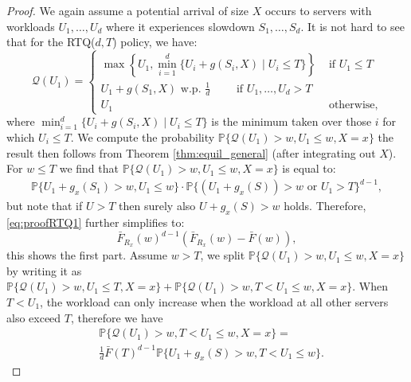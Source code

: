 \documentclass[12pt]{report}
\renewcommand{\P}{\mathbb{P}}
\newcommand{\QQ}{\mathcal{Q}}
\renewcommand{\P}{\mathbb{P}}
\begin{document}
\begin{proof}

We again assume a potential arrival of size $X$ occurs to servers with workloads $U_1,\dots, U_d$ where it experiences slowdown $S_1,\dots,S_d$. It is not hard to see that for the RTQ($d,T$) policy, we have:
\begin{equation*}
\QQ(U_1) = \begin{cases}
            \max\left\{U_1,\min_{i=1}^d\{U_i+g(S_i,X) \mid U_i \leq T \} \right\} & \mbox{ if } U_1 \leq T \\
    U_1 + g(S_1,X) \mbox{ w.p. } \frac{1}{d} \qquad \mbox{ if } U_1,\dots,U_d >T\\        
          U_1 & \mbox{ otherwise,}
          \end{cases}
 \end{equation*}
where $\min_{i=1}^d\{U_i+g(S_i,X) \mid U_i \leq T \}$ is the minimum taken over those $i$ for which $U_i \leq T$.
We compute the probability $\P\{\QQ(U_1) > w, U_1 \leq w, X=x\}$ the result then follows from Theorem \ref{thm:equil_general} (after integrating out $X$). For $w\leq T$ we find that $\P\{\QQ(U_1) > w, U_1 \leq w, X=x\}$ is equal to:
\begin{align}
\P\{U_1+g_x(S_1)>w, U_1\leq w\} \cdot \P\{ (U_1+g_x(S)) > w \mbox{ or } U_1 > T\}^{d-1}, \label{eq:proofRTQ1}
\end{align}
but note that if $U>T$ then surely also $U+g_x(S) > w$ holds. Therefore, \eqref{eq:proofRTQ1} further simplifies to:
$$
\bar F_{R_x}(w)^{d-1} (\bar F_{R_x}(w) - \bar F(w)),
$$
this shows the first part. Assume $w>T$, we split $\P\{\QQ(U_1) > w, U_1 \leq w, X=x\}$ by writing it as $\P\{\QQ(U_1) > w, U_1 \leq T, X=x\} + \P\{\QQ(U_1) > w, T< U_1 \leq w, X=x\}$. When $T<U_1$, the workload can only increase when the workload at all other servers also exceed $T$, therefore we have
\begin{align}
&\P\{\QQ(U_1) > w, T< U_1 \leq w, X=x\}=\nonumber\\
&\frac{1}{d} \bar F(T)^{d-1} \P\{U_1+g_x(S) > w, T < U_1 \leq w\}. \label{eq:proofRTQ2}

\end{align}
\end{proof}
\end{document}
